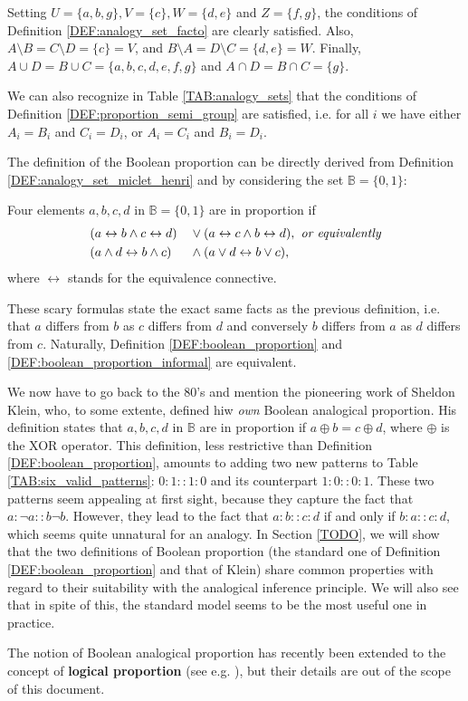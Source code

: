 Setting $U = \{a, b, g\}, V = \{c\}, W = \{d, e\}$ and $Z = \{f, g\}$, the
conditions of Definition  \ref{DEF:analogy_set_facto}  are clearly satisfied.
Also, $A \setminus B = C \setminus D = \{c\} = V$, and $B\setminus A = D
\setminus C = \{d, e\} = W$. Finally, $A \cup D = B \cup C = \{a, b, c, d, e,
f, g\}$ and $A\cap D = B\cap C = \{g\}$.

We can also recognize in Table \ref{TAB:analogy_sets} that the conditions of
Definition \ref{DEF:proportion_semi_group} are satisfied, i.e. for all $i$ we
have either $A_i = B_i$ and $C_i = D_i$, or $A_i = C_i$ and $B_i = D_i$.

The definition of the Boolean proportion can be directly derived from
Definition \ref{DEF:analogy_set_miclet_henri} and by considering the set
$\mathbb{B} = \{0, 1\}$:

\begin{definition}
  \label{DEF:boolean_proportion}
  Four elements $a, b, c, d$ in $\mathbb{B} = \{0, 1\}$ are in proportion if
  \begin{alignat*}{2}
    &(a \leftrightarrow b \wedge c \leftrightarrow d) && \vee (a
    \leftrightarrow c \wedge b \leftrightarrow d), \emph{ or equivalently}\\
     & (a \wedge d \leftrightarrow b \wedge c) &&\wedge (a \vee  d
    \leftrightarrow b \vee c),
  \end{alignat*}
  where $\leftrightarrow$ stands for the equivalence connective.
\end{definition}

These scary formulas state the exact same facts as the previous definition,
i.e. that $a$ differs from $b$ as $c$ differs from $d$ and conversely $b$
differs from $a$ as $d$ differs from $c$. Naturally, Definition
\ref{DEF:boolean_proportion} and \ref{DEF:boolean_proportion_informal} are
equivalent.

We now have to go back to the 80's and mention the pioneering work of Sheldon
Klein, who, to some extente, defined hiw \textit{own} Boolean analogical
proportion. His definition states that $a, b, c, d$ in $\mathbb{B}$ are in
proportion if $a \oplus b = c \oplus d$, where $\oplus$ is the XOR operator.
This definition, less restrictive than Definition \ref{DEF:boolean_proportion},
amounts to adding two new patterns to Table \ref{TAB:six_valid_patterns}:
$0:1::1:0$ and its counterpart $1:0::0:1$. These two patterns seem appealing at
first sight, because they capture the fact that $a : \neg a :: b \neg b$.
However, they lead to the fact that $a:b::c:d$ if and only if $b : a :: c :d$,
which seems quite unnatural for an analogy. In Section \ref{TODO}, we will show
that the two definitions of Boolean proportion (the standard one of Definition
\ref{DEF:boolean_proportion} and that of Klein) share common properties with
regard to their suitability with the analogical inference principle. We will
also see that in spite of this, the standard model seems to be the most useful
one in practice.

The notion of Boolean analogical proportion has recently been extended to the
concept of \textbf{logical proportion} (see e.g. \cite{PraRic14}), but their
details are out of the scope of this document.
